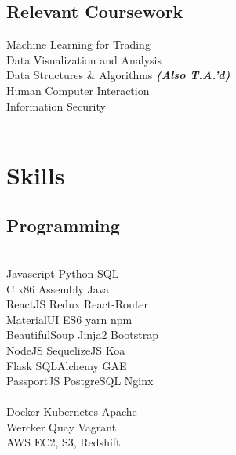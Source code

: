 \documentclass[]{deedy-resume-openfont}
\begin{document}
\begin{minipage}[t]{0.31\textwidth}
\subsection{Relevant Coursework}
Machine Learning for Trading \\
Data Visualization and Analysis \\
Data Structures \& Algorithms {\footnotesize \textit{\textbf{(Also T.A.'d) }}} \\
Human Computer Interaction \\
Information Security \\

\\[1\baselineskip]


\section{Skills}
\subsection{Programming}
\\[1\baselineskip]

Javascript \textbullet{} Python \textbullet{} SQL
\\[1\baselineskip]

 C \textbullet{} x86 Assembly \textbullet{} Java
\\[1\baselineskip]

ReactJS \textbullet{} Redux \textbullet{} React-Router \\
MaterialUI \textbullet{} ES6 \textbullet{} yarn \textbullet{} npm \\
BeautifulSoup \textbullet{} Jinja2 \textbullet{} Bootstrap
\\[1\baselineskip]

NodeJS \textbullet{} SequelizeJS \textbullet{} Koa\\
Flask \textbullet{} SQLAlchemy \textbullet{} GAE\\
PassportJS \textbullet{} PostgreSQL \textbullet{} Nginx \\
\\[1\baselineskip]

Docker \textbullet{} Kubernetes \textbullet{} Apache \\
Wercker \textbullet{}  Quay \textbullet{} Vagrant \\
AWS EC2, S3, Redshift
\\[1\baselineskip]


\end{minipage}
\end{document}
